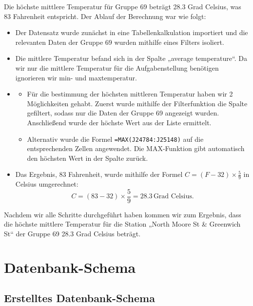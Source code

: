 \documentclass{article}
\begin{document}
Die höchste mittlere Temperatur für Gruppe 69 beträgt 28.3 Grad Celsius, was 83 Fahrenheit entspricht. Der Ablauf der Berechnung war wie folgt:
\begin{itemize}
    \item  Der Datensatz wurde zunächst in eine Tabellenkalkulation importiert und die relevanten Daten der Gruppe 69 wurden mithilfe eines Filters isoliert.
    \item Die mittlere Temperatur befand sich in der Spalte „average temperature“. Da wir nur die mittlere Temperatur für die Aufgabenstellung benötigen ignorieren wir min- und maxtemperatur.
    \item 
    \begin{itemize}
        \item Für die bestimmung der höchsten mittleren Temperatur haben wir 2 Möglichkeiten gehabt. Zuerst wurde mithilfe der Filterfunktion die Spalte gefiltert, sodass nur die Daten der Gruppe 69 angezeigt wurden. Anschließend wurde der höchste Wert aus der Liste ermittelt.
        \item  Alternativ wurde die Formel \texttt{=MAX(J24784:J25148)} auf die entsprechenden Zellen angewendet. Die MAX-Funktion gibt automatisch den höchsten Wert in der Spalte zurück.
    \end{itemize}
    \item  Das Ergebnis, 83 Fahrenheit, wurde mithilfe der Formel $C = (F - 32) \times \frac{5}{9}$ in Celsius umgerechnet:
    \[
    C = (83 - 32) \times \frac{5}{9} = 28.3 \, \text{Grad Celsius}.
    \]
\end{itemize}



Nachdem wir alle Schritte durchgeführt haben kommen wir zum Ergebnis, dass die höchste mittlere Temperatur für die Station „North Moore St \& Greenwich St“ der Gruppe 69 28.3 Grad Celsius beträgt.

\newpage 
\newpage 


\section{Datenbank-Schema}
\label{sec:datenbank-schema}

\subsection{Erstelltes Datenbank-Schema}
\label{sec:datenbankschema}
\end{document}
